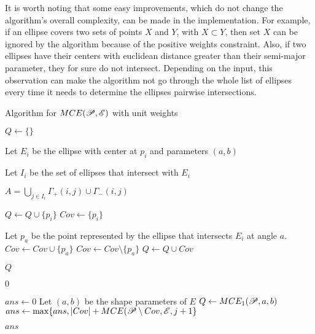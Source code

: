 It is worth noting that some easy improvements, which do not change the algorithm's overall complexity, can be made in the implementation. For example, if an ellipse covers two sets of points $X$ and $Y$, with $X \subset Y$, then set $X$ can be ignored by the algorithm because of the positive weights constraint. Also, if two ellipses have their centers with euclidean distance greater than their semi-major parameter, they for sure do not intersect. Depending on the input, this observation can make the algorithm not go through the whole list of ellipses every time it needs to determine the ellipses pairwise intersections.



\begin{algoritmo}[b]
\caption{Algorithm for $MCE(\mathscr{P}, \mathscr{E})$ with unit weights}\label{algoritmo:mce}
\begin{algorithmic}[1]
\State $Q \gets \{\}$

\State Let $E_i$ be the ellipse with center at $p_i$ and parameters $(a,b)$

\State Let $I_i$ be the set of ellipses that intersect with $E_i$

\State $A = \bigcup_{j \in I_i} \Gamma_+(i,j) \cup \Gamma_-(i,j)$

\State $Q \gets Q \cup \{p_i\}$ 
\State $Cov \gets \{p_i\}$ 

 
\State Let $p_a$ be the point represented by the ellipse that intersects $E_i$ at angle $a$. 
\State $Cov \gets Cov \cup \{p_a\}$
\Else
\State $Cov \gets Cov \setminus \{p_a\}$
\EndIf
\State $Q \gets Q \cup Cov$
\EndFor
\EndFor
\EndFor

\State \Return $Q$
\EndProcedure

\State \Return $0$
\EndIf

\State $ans \gets 0$
\State Let $(a,b)$ be the shape parameters of $E$
\State $Q \gets MCE_1(\mathscr{P}, a, b)$
\State $ans \gets \max\{ans, |Cov| + MCE(\mathscr{P} \setminus Cov, \mathscr{E}, j+1 \}$ 
\EndFor
\EndFor

\State \Return $ans$
\EndProcedure
\end{algorithmic}
\end{algoritmo}
 